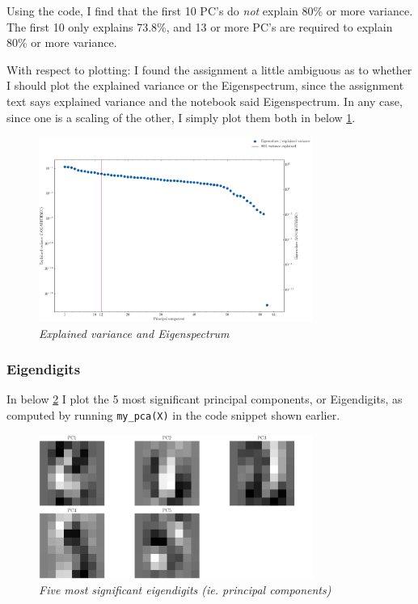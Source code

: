 Using the code, I find that the first 10 PC's do \textit{not} explain 80\% or
more variance. The first 10 only explains 73.8\%, and 13 or more PC's are
required to explain 80\% or more variance.


With respect to plotting: I found the assignment a little ambiguous as to
whether I should plot the explained variance or the Eigenspectrum, since the
assignment text says explained variance and the notebook said Eigenspectrum. In
any case, since one is a scaling of the other, I simply plot them both in below
\cref{fig:exp_var}.

\begin{figure}[H]
  \centering
  \includegraphics[width=0.8\textwidth]{figures/exp_var_eigenspectrum.png}
  \caption{\small \textit{Explained variance and Eigenspectrum}}
  \label{fig:exp_var}
\end{figure}


\subsubsection{Eigendigits}

In below \cref{fig:eigendigits} I plot the 5 most significant principal
components, or Eigendigits, as computed by running \texttt{my\_pca(X)} in the
code snippet shown earlier.

\begin{figure}[H]
  \centering
  \includegraphics[width=0.8\textwidth]{figures/eigendigits.png}
  \caption{\small \textit{Five most significant eigendigits (ie. principal
  components)}}
  \label{fig:eigendigits}
\end{figure}

\sectend
